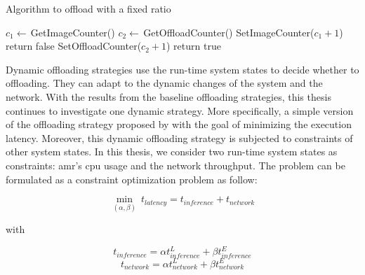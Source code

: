 \begin{algorithm}[htp]
\caption{Algorithm to offload with a fixed ratio}\label{alg:ratio_strategy}
\begin{algorithmic}[1]
     
        \State $c_1 \gets \, $GetImageCounter()
        \State $c_2 \gets \, $GetOffloadCounter()
        \State SetImageCounter($c_1 + 1$) 
            \State return false 
        \Else
            \State SetOffloadCounter($c_2 + 1$)
            \State return true 
        \EndIf
    \EndFunction
\end{algorithmic}
\end{algorithm}

Dynamic offloading strategies use the run-time system states to decide whether to offloading. They can adapt to the dynamic changes of the system and the network. With the results from the baseline offloading strategies, this thesis continues to investigate one dynamic strategy. More specifically, a simple version of the offloading strategy proposed by \citeauthor*{Ning2019} \cite{Ning2019} with the goal of minimizing the execution latency. Moreover, this dynamic offloading strategy is subjected to constraints of other system states. In this thesis, we consider two run-time system states as constraints: \gls{amr}'s \gls{cpu} usage and the network throughput. The problem can be formulated as a constraint optimization problem as follow:

\begin{equation}
    \min_{(\alpha, \beta)} \: t_{latency} = t_{inference} + t_{network}
\end{equation}

with

\begin{equation*}
    t_{inference} = \alpha t_{inference}^{L} + \beta t_{inference}^{E}
\end{equation*}
\begin{equation*}
    t_{network} = \alpha t_{network}^{L} + \beta t_{network}^{E}
\end{equation*}

